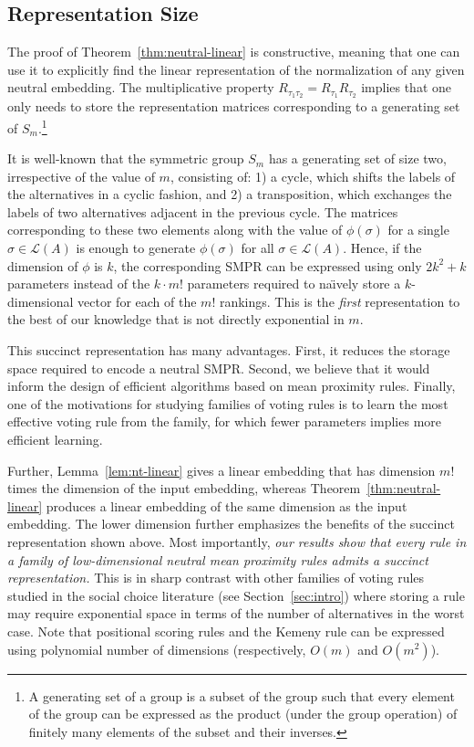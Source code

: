 \documentclass[prodmode]{acmsmall-ec14}
\newcommand{\calL}{{\mathcal{L}}}
\newcommand{\rank}{{\calL(A)}}
\begin{document}
\subsection{Representation Size}
The proof of Theorem~\ref{thm:neutral-linear} is constructive, meaning that one can use it to explicitly find the linear representation of the normalization of any given neutral embedding. The multiplicative property $R_{\tau_1 \tau_2} = R_{\tau_1} R_{\tau_2}$ implies that one only needs to store the representation matrices corresponding to a generating set of $S_m$.\footnote{A generating set of a group is a subset of the group such that every element of the group can be expressed as the product (under the group operation) of finitely many elements of the subset and their inverses.} 

It is well-known that the symmetric group $S_m$ has a generating set of size two, irrespective of the value of $m$, consisting of: 1) a cycle, which shifts the labels of the alternatives in a cyclic fashion, and 2) a transposition, which exchanges the labels of two alternatives adjacent in the previous cycle. The matrices corresponding to these two elements along with the value of $\phi(\sigma)$ for a single $\sigma \in \rank$ is enough to generate $\phi(\sigma)$ for all $\sigma \in \rank$. Hence, if the dimension of $\phi$ is $k$, the corresponding SMPR can be expressed using only $2 k^2 + k$ parameters instead of the $k \cdot m!$ parameters required to na\"{\i}vely store a $k$-dimensional vector for each of the $m!$ rankings. This is the \emph{first} representation to the best of our knowledge that is not directly exponential in $m$. %

This succinct representation has many advantages. First, it reduces the storage space required to encode a neutral SMPR. Second, we believe that it would inform the design of efficient algorithms based on mean proximity rules. Finally, one of the motivations for studying families of voting rules is to learn the most effective voting rule from the family, for which fewer parameters implies more efficient learning. 

Further, Lemma~\ref{lem:nt-linear} gives a linear embedding that has dimension $m!$ times the dimension of the input embedding, whereas Theorem~\ref{thm:neutral-linear} produces a linear embedding of the same dimension as the input embedding. The lower dimension further emphasizes the benefits of the succinct representation shown above. Most importantly, \emph{our results show that every rule in a family of low-dimensional neutral mean proximity rules admits a succinct representation.} This is in sharp contrast with other families of voting rules studied in the social choice literature (see Section~\ref{sec:intro}) where storing a rule may require exponential space in terms of the number of alternatives in the worst case. Note that positional scoring rules and the Kemeny rule can be expressed using polynomial number of dimensions (respectively, $O(m)$ and $O(m^2)$). 
\end{document}
